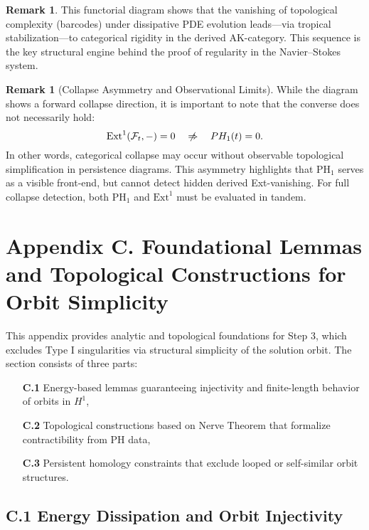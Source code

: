 \documentclass[11pt]{article}
\theoremstyle{definition}
\newtheorem{remark}[theorem]{Remark}
\begin{document}
\begin{remark}
This functorial diagram shows that the vanishing of topological complexity (barcodes) under dissipative PDE evolution leads—via tropical stabilization—to categorical rigidity in the derived AK-category. This sequence is the key structural engine behind the proof of regularity in the Navier--Stokes system.
\end{remark}

\begin{remark}[Collapse Asymmetry and Observational Limits]
While the diagram shows a forward collapse direction, it is important to note that the converse does not necessarily hold:
\[
\mathrm{Ext}^1(\mathcal{F}_t, -) = 0 \quad \centernot\Rightarrow \quad PH_1(t) = 0.
\]
In other words, categorical collapse may occur without observable topological simplification in persistence diagrams.  
This asymmetry highlights that $\mathrm{PH}_1$ serves as a visible front-end, but cannot detect hidden derived Ext-vanishing.  
For full collapse detection, both $\mathrm{PH}_1$ and $\mathrm{Ext}^1$ must be evaluated in tandem.
\end{remark}



\section*{Appendix C. Foundational Lemmas and Topological Constructions for Orbit Simplicity}
\label{sec:appendixC}

This appendix provides analytic and topological foundations for Step 3, which excludes Type I singularities via structural simplicity of the solution orbit. The section consists of three parts:
\begin{itemize}
  \item[\textbf{C.1}] Energy-based lemmas guaranteeing injectivity and finite-length behavior of orbits in \( H^1 \),
  \item[\textbf{C.2}] Topological constructions based on Nerve Theorem that formalize contractibility from PH data,
  \item[\textbf{C.3}] Persistent homology constraints that exclude looped or self-similar orbit structures.
\end{itemize}

\subsection*{C.1 Energy Dissipation and Orbit Injectivity}
\end{document}
